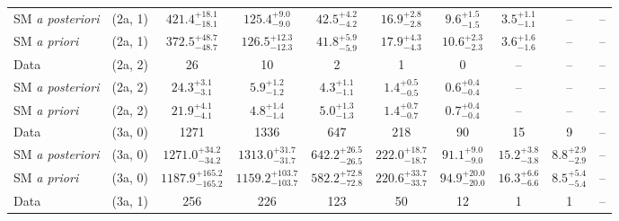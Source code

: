 \begin{table}[h!]
{\begin{tabular}{lccccccccc}
	SM {\it a posteriori} & (2a, 1)           & $421.4^{+ 18.1 }_{- 18.1 }$    & $125.4^{+ 9.0 }_{- 9.0 }$      & $42.5^{+ 4.2 }_{- 4.2 }$    & $16.9^{+ 2.8 }_{- 2.8 }$    & $9.6^{+ 1.5 }_{- 1.5 }$     & $3.5^{+ 1.1 }_{- 1.1 }$  & --                       & --           \\[0.5ex] 
	SM {\it a priori}     & (2a, 1)           & $372.5^{+ 48.7 }_{- 48.7 }$    & $126.5^{+ 12.3 }_{- 12.3 }$    & $41.8^{+ 5.9 }_{- 5.9 }$    & $17.9^{+ 4.3 }_{- 4.3 }$    & $10.6^{+ 2.3 }_{- 2.3 }$    & $3.6^{+ 1.6 }_{- 1.6 }$  & --                       & --           \\[0.5ex] 
	Data                  & (2a, 2)           & 26                             & 10                             & 2                           & 1                           & 0                           & --                       & --                       & --           \\[0.5ex] 
	SM {\it a posteriori} & (2a, 2)           & $24.3^{+ 3.1 }_{- 3.1 }$       & $5.9^{+ 1.2 }_{- 1.2 }$        & $4.3^{+ 1.1 }_{- 1.1 }$     & $1.4^{+ 0.5 }_{- 0.5 }$     & $0.6^{+ 0.4 }_{- 0.4 }$     & --                       & --                       & --           \\[0.5ex] 
	SM {\it a priori}     & (2a, 2)           & $21.9^{+ 4.1 }_{- 4.1 }$       & $4.8^{+ 1.4 }_{- 1.4 }$        & $5.0^{+ 1.3 }_{- 1.3 }$     & $1.4^{+ 0.7 }_{- 0.7 }$     & $0.7^{+ 0.4 }_{- 0.4 }$     & --                       & --                       & --           \\[0.5ex] 
	Data                  & (3a, 0)           & 1271                           & 1336                           & 647                         & 218                         & 90                          & 15                       & 9                        & --           \\[0.5ex] 
	SM {\it a posteriori} & (3a, 0)           & $1271.0^{+ 34.2 }_{- 34.2 }$   & $1313.0^{+ 31.7 }_{- 31.7 }$   & $642.2^{+ 26.5 }_{- 26.5 }$ & $222.0^{+ 18.7 }_{- 18.7 }$ & $91.1^{+ 9.0 }_{- 9.0 }$    & $15.2^{+ 3.8 }_{- 3.8 }$ & $8.8^{+ 2.9 }_{- 2.9 }$  & --           \\[0.5ex] 
	SM {\it a priori}     & (3a, 0)           & $1187.9^{+ 165.2 }_{- 165.2 }$ & $1159.2^{+ 103.7 }_{- 103.7 }$ & $582.2^{+ 72.8 }_{- 72.8 }$ & $220.6^{+ 33.7 }_{- 33.7 }$ & $94.9^{+ 20.0 }_{- 20.0 }$  & $16.3^{+ 6.6 }_{- 6.6 }$ & $8.5^{+ 5.4 }_{- 5.4 }$  & --           \\[0.5ex] 
	Data                  & (3a, 1)           & 256                            & 226                            & 123                         & 50                          & 12                          & 1                        & 1                        & --           \\[0.5ex] 

\end{tabular}}
\end{table}
